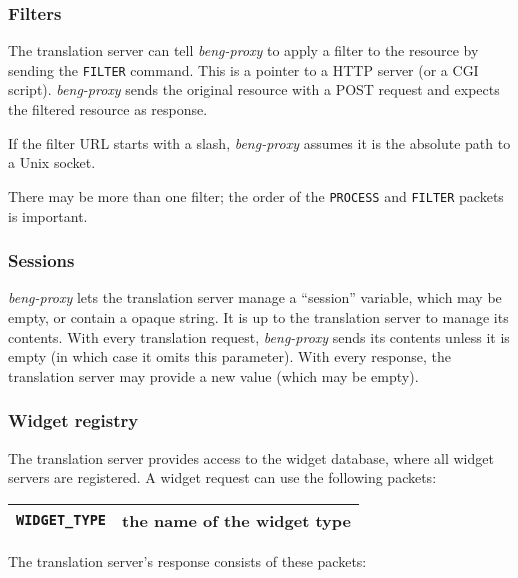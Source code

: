 \documentclass[a4paper,12pt]{article}
\begin{document}
\subsubsection{Filters}
\label{filter}

The translation server can tell \emph{beng-proxy} to apply a filter to
the resource by sending the \texttt{FILTER} command.  This is a
pointer to a HTTP server (or a CGI script).  \emph{beng-proxy} sends
the original resource with a POST request and expects the filtered
resource as response.

If the filter URL starts with a slash, \emph{beng-proxy} assumes it is
the absolute path to a Unix socket.

There may be more than one filter; the order of the \texttt{PROCESS}
and \texttt{FILTER} packets is important.

\subsubsection{Sessions}
\label{sessions}

\emph{beng-proxy} lets the translation server manage a ``session''
variable, which may be empty, or contain a opaque string.  It is up to
the translation server to manage its contents.  With every translation
request, \emph{beng-proxy} sends its contents unless it is empty (in
which case it omits this parameter).  With every response, the
translation server may provide a new value (which may be empty).

\subsubsection{Widget registry}

The translation server provides access to the widget database, where
all widget servers are registered.  A widget request can use the
following packets:

\begin{tabular}{|l|p{10cm}|}
\hline
\texttt{WIDGET\_TYPE} & the name of the widget type \\
\hline
\end{tabular}

The translation server's response consists of these packets:
\end{document}
